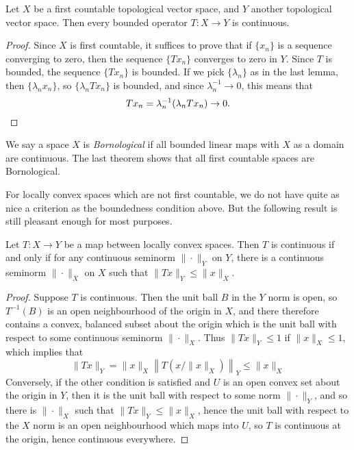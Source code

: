 \begin{theorem}
    Let $X$ be a first countable topological vector space, and $Y$ another topological vector space. Then every bounded operator $T: X \to Y$ is continuous.
\end{theorem}
\begin{proof}
    Since $X$ is first countable, it suffices to prove that if $\{ x_n \}$ is a sequence converging to zero, then the sequence $\{ Tx_n \}$ converges to zero in $Y$. Since $T$ is bounded, the sequence $\{ Tx_n \}$ is bounded. If we pick $\{ \lambda_n \}$ as in the last lemma, then $\{ \lambda_n x_n \}$, so $\{ \lambda_n Tx_n \}$ is bounded, and since $\lambda_n^{-1} \to 0$, this means that
    \[ Tx_n = \lambda_n^{-1} (\lambda_n Tx_n) \to 0. \qedhere \]
\end{proof}

We say a space $X$ is \emph{Bornological} if all bounded linear maps with $X$ as a domain are continuous. The last theorem shows that all first countable spaces are Bornological.

For locally convex spaces which are not first countable, we do not have quite as nice a criterion as the boundedness condition above. But the following result is still pleasant enough for most purposes.

\begin{theorem}
    Let $T: X \to Y$ be a map between locally convex spaces. Then $T$ is continuous if and only if for any continuous seminorm $\| \cdot \|_Y$ on $Y$, there is a continuous seminorm $\| \cdot \|_X$ on $X$ such that $\| Tx \|_Y \leq \| x \|_X$.
\end{theorem}
\begin{proof}
    Suppose $T$ is continuous. Then the unit ball $B$ in the $Y$ norm is open, so $T^{-1}(B)$ is an open neighbourhood of the origin in $X$, and there therefore contains a convex, balanced subset about the origin which is the unit ball with respect to some continuous seminorm $\| \cdot \|_X$. Thus $\| Tx \|_Y \leq 1$ if $\| x \|_X \leq 1$, which implies that
    \[ \| Tx \|_Y = \| x \|_X \left\| T \left( x/\|x \|_X \right) \right\|_Y \leq \| x \|_X \]
    Conversely, if the other condition is satisfied and $U$ is an open convex set about the origin in $Y$, then it is the unit ball with respect to some norm $\| \cdot \|_Y$, and so there is $\| \cdot \|_X$ such that $\| Tx \|_Y \leq \| x \|_X$, hence the unit ball with respect to the $X$ norm is an open neighbourhood which maps into $U$, so $T$ is continuous at the origin, hence continuous everywhere.
\end{proof}

